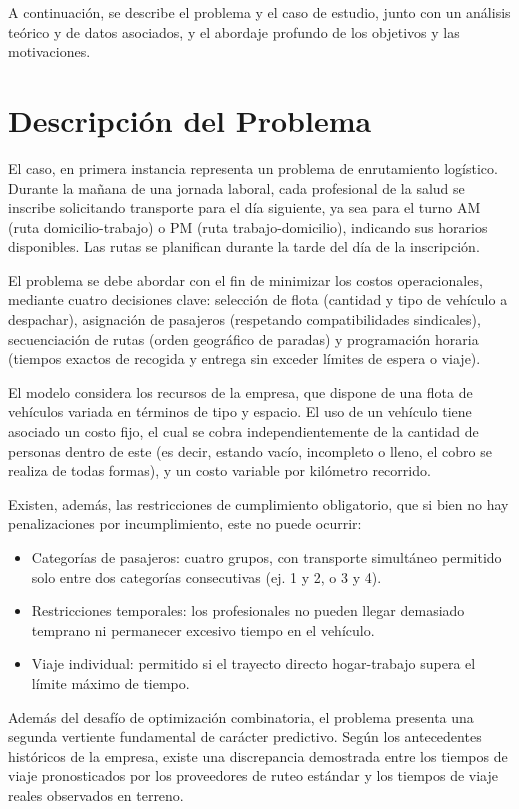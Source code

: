 A continuación, se describe el problema y el caso de estudio, junto con un análisis teórico y de datos asociados, y el abordaje profundo de los objetivos y las motivaciones.

\section{Descripción del Problema}

El caso, en primera instancia representa un problema de enrutamiento logístico. Durante la mañana de una jornada laboral, cada profesional de la salud se inscribe solicitando transporte para el día siguiente, ya sea para el turno AM (ruta domicilio-trabajo) o PM (ruta trabajo-domicilio), indicando sus horarios disponibles. Las rutas se planifican durante la tarde del día de la inscripción.

El problema se debe abordar con el fin de minimizar los costos operacionales, mediante cuatro decisiones clave: selección de flota (cantidad y tipo de vehículo a despachar), asignación de pasajeros (respetando compatibilidades sindicales), secuenciación de rutas (orden geográfico de paradas) y programación horaria (tiempos exactos de recogida y entrega sin exceder límites de espera o viaje).

El modelo considera los recursos de la empresa, que dispone de una flota de vehículos variada en términos de tipo y espacio. El uso de un vehículo tiene asociado un costo fijo, el cual se cobra independientemente de la cantidad de personas dentro de este (es decir, estando vacío, incompleto o lleno, el cobro se realiza de todas formas), y un costo variable por kilómetro recorrido. 

Existen, además, las restricciones de cumplimiento obligatorio, que si bien no hay penalizaciones por incumplimiento, este no puede ocurrir:
\begin{itemize}
    \item Categorías de pasajeros: cuatro grupos, con transporte simultáneo permitido solo entre dos categorías consecutivas (ej. 1 y 2, o 3 y 4).
    \item Restricciones temporales: los profesionales no pueden llegar demasiado temprano ni permanecer excesivo tiempo en el vehículo.
    \item Viaje individual: permitido si el trayecto directo hogar-trabajo supera el límite máximo de tiempo.
\end{itemize}

Además del desafío de optimización combinatoria, el problema presenta una segunda vertiente fundamental de carácter predictivo. Según los antecedentes históricos de la empresa, existe una discrepancia demostrada entre los tiempos de viaje pronosticados por los proveedores de ruteo estándar y los tiempos de viaje reales observados en terreno. 

